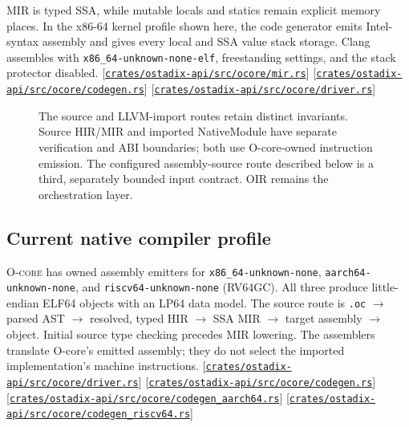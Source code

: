 \documentclass[11pt,oneside]{article}
\newcommand{\ocore}{{\mdseries\textsc{O-core}}}
\newcommand{\src}[1]{\textcolor{OSlate}{\scriptsize[\href{https://github.com/lostadi/OSTADIX/blob/c0b02c326b2329a95ba52447c7180bc93957cd57/#1}{\nolinkurl{#1}}]}\allowbreak}
\begin{document}
MIR is typed SSA, while mutable locals and statics remain explicit memory
places. In the x86-64 kernel profile shown here, the code generator emits
Intel-syntax assembly and gives every local and SSA value stack storage.
Clang assembles with
\texttt{x86\_64-unknown-none-elf}, freestanding settings, and the stack
protector disabled. \src{crates/ostadix-api/src/ocore/mir.rs}
\src{crates/ostadix-api/src/ocore/codegen.rs}
\src{crates/ostadix-api/src/ocore/driver.rs}

\begin{figure}[htbp]
\centering
{}
\caption{The source and LLVM-import routes retain distinct invariants.
Source HIR/MIR and imported NativeModule have separate verification and ABI
boundaries; both use O-core-owned instruction emission. The configured
assembly-source route described below is a third, separately bounded input
contract. OIR remains the orchestration layer.}
\label{fig:two-native-routes}
\end{figure}

\subsection{Current native compiler profile}

\ocore{} has owned assembly emitters for
\texttt{x86\_64-unknown-none}, \texttt{aarch64-unknown-none}, and
\texttt{riscv64-unknown-none} (RV64GC). All three produce little-endian
ELF64 objects with an LP64 data model. The source route is
\texttt{.oc} $\rightarrow$ parsed AST $\rightarrow$ resolved, typed HIR
$\rightarrow$ SSA MIR $\rightarrow$ target assembly $\rightarrow$ object.
Initial source type checking precedes MIR lowering. The assemblers translate
O-core's emitted assembly; they do not select the imported implementation's
machine instructions.
\src{crates/ostadix-api/src/ocore/driver.rs}
\src{crates/ostadix-api/src/ocore/codegen.rs}
\src{crates/ostadix-api/src/ocore/codegen_aarch64.rs}
\src{crates/ostadix-api/src/ocore/codegen_riscv64.rs}
\end{document}
